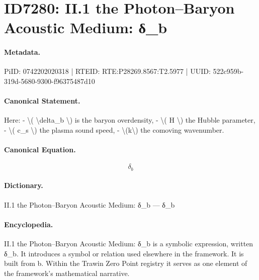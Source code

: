 \section*{ID7280: II.1 the Photon–Baryon Acoustic Medium: δ\_b}
\paragraph{Metadata.}
PiID: 0742202020318 | RTEID: RTE:P28269.8567:T2.5977 | UUID: 522c959b-319d-5680-9300-f96375487d10

\paragraph{Canonical Statement.}
Here: - \textbackslash{}( \textbackslash{}delta\_b \textbackslash{}) is the baryon overdensity, - \textbackslash{}( H \textbackslash{}) the Hubble parameter, - \textbackslash{}( c\_s \textbackslash{}) the plasma sound speed, - \textbackslash{}(k\textbackslash{}) the comoving wavenumber.

\paragraph{Canonical Equation.}
\[
\delta_b
\]

\paragraph{Dictionary.}
II.1 the Photon–Baryon Acoustic Medium: δ\_b — δ\_b

\paragraph{Encyclopedia.}
II.1 the Photon–Baryon Acoustic Medium: δ\_b is a symbolic expression, written δ\_b. It introduces a symbol or relation used elsewhere in the framework. It is built from b. Within the Trawin Zero Point registry it serves as one element of the framework's mathematical narrative.
